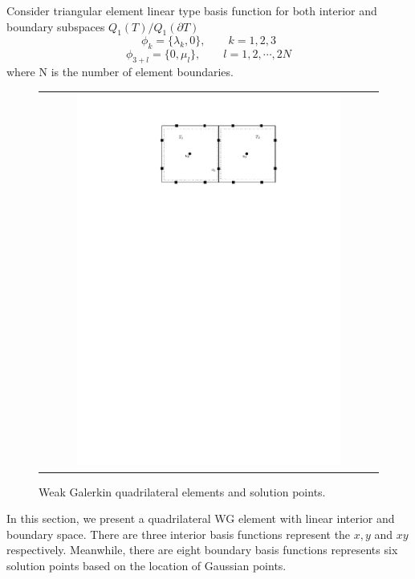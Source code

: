 Consider triangular element linear type basis function for both interior and boundary subspaces $ Q_{1}(T) / Q_{1} (\partial T) $
\begin{equation}
\phi_{k} = \{ \lambda_{k}, 0 \}, \qquad k = 1,2, 3
\end{equation}
\begin{equation}
\phi_{3 + l} = \{ 0, \mu_{l} \}, \qquad l = 1, 2, \cdots , 2N
\end{equation}
where N is the number of element boundaries.
\begin{figure}[h]
	\centering
	\begin{tabular}{c}
		\includegraphics[width=0.8\textwidth]{./pics/quad.pdf}
	\end{tabular}
	\caption{\footnotesize Weak Galerkin quadrilateral elements and solution points.}\label{fig2: quad}
\end{figure}

In this section, we present a quadrilateral WG element with linear interior and boundary space. There are three interior basis functions represent the $ x, y $ and $ xy $ respectively. Meanwhile, there are eight boundary basis functions represents six solution points based on the location of Gaussian points.


